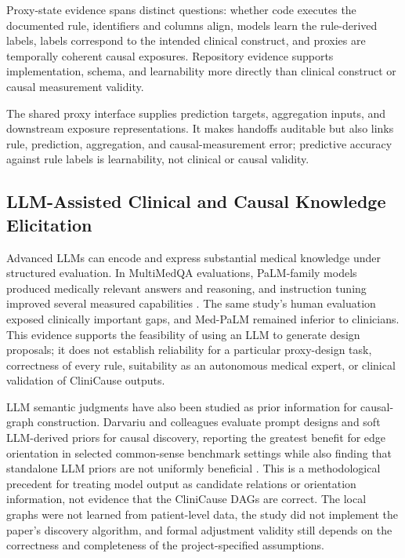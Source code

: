 Proxy-state evidence spans distinct questions: whether code executes the documented rule, identifiers and columns align, models learn the rule-derived labels, labels correspond to the intended clinical construct, and proxies are temporally coherent causal exposures.  Repository evidence supports implementation, schema, and learnability more directly than clinical construct or causal measurement validity.

The shared proxy interface supplies prediction targets, aggregation inputs, and downstream exposure representations.  It makes handoffs auditable but also links rule, prediction, aggregation, and causal-measurement error; predictive accuracy against rule labels is learnability, not clinical or causal validity.

\subsection{LLM-Assisted Clinical and Causal Knowledge Elicitation}

Advanced LLMs can encode and express substantial medical knowledge under structured evaluation.  In MultiMedQA evaluations, PaLM-family models produced medically relevant answers and reasoning, and instruction tuning improved several measured capabilities \cite{singhal_et_al_2023_llm_clinical_knowledge}.  The same study's human evaluation exposed clinically important gaps, and Med-PaLM remained inferior to clinicians.  This evidence supports the feasibility of using an LLM to generate design proposals; it does not establish reliability for a particular proxy-design task, correctness of every rule, suitability as an autonomous medical expert, or clinical validation of CliniCause outputs.

LLM semantic judgments have also been studied as prior information for causal-graph construction.  Darvariu and colleagues evaluate prompt designs and soft LLM-derived priors for causal discovery, reporting the greatest benefit for edge orientation in selected common-sense benchmark settings while also finding that standalone LLM priors are not uniformly beneficial \cite{darvariu_et_al_2024_llm_causal_graph_priors}.  This is a methodological precedent for treating model output as candidate relations or orientation information, not evidence that the CliniCause DAGs are correct.  The local graphs were not learned from patient-level data, the study did not implement the paper's discovery algorithm, and formal adjustment validity still depends on the correctness and completeness of the project-specified assumptions.

